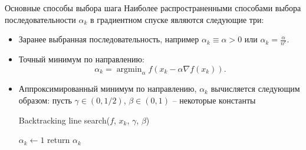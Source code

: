 \documentclass[10pt]{beamer}
\DeclareMathOperator{\argmin}{argmin}
\begin{document}
\begin{frame}{Основные способы выбора шага}
Наиболее распространенными способами выбора последовательности $\alpha_k$ в градиентном спуске являются следующие три:
\begin{itemize}
\item Заранее выбранная последовательность, например $\alpha_k\equiv \alpha>0$ или $\alpha_k=\frac{\alpha}{n^c}$.
\item Точный минимум по направлению: 
$$
\alpha_k=\argmin_\alpha f(x_k-\alpha\nabla f(x_k)).
$$
\item Аппроксимированный минимум по направлению, $\alpha_k$ вычисляется следующим образом: пусть $\gamma\in(0, 1/2)$, 
$\beta\in (0, 1)$ -- некоторые константы
\begin{function}[H]
 \caption{Backtracking line search($f$, $x_k$, $\gamma$, $\beta$)}
 $\alpha_k\leftarrow 1$\;
 return $\alpha_k$\;
\end{function}

\end{itemize}


\end{frame}
\end{document}
